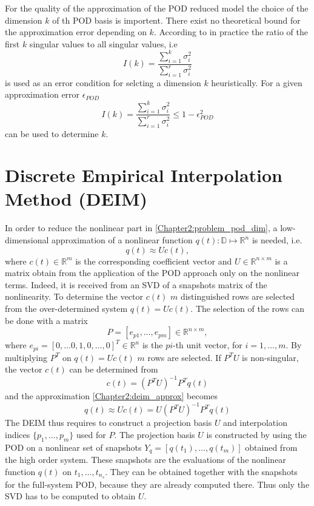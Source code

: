 For the quality of the approximation of the POD reduced model
the choice of the dimension $k$ of th POD basis is importent. There exist no theoretical bound
for the approximation error depending on $k$.
According to \cite{ROM_book2} in practice the ratio of the first $k$ singular values to all singular values, i.e
\begin{equation}
 I(k) =\frac{ \sum_{i=1}^k \sigma^2_i}{\sum_{i=1}^r \sigma^2_i}
\end{equation}
is used as an error condition for selcting a dimension $k$  heuristically.
For a given approximation error $\epsilon_{POD}$ 
\begin{equation}\label{Chapter2:eq:error_funcion_pod}
  I(k) = \frac{ \sum_{i=1}^k \sigma^2_i}{\sum_{i=1}^r \sigma^2_i} \leq 1- \epsilon_{POD}^2
\end{equation}
can be used to determine $k$. 

\section{Discrete Empirical Interpolation Method (DEIM)}
\label{Chapter2:deim}
In order to reduce the nonlinear part in \eqref{Chapter2:problem_pod_dim}, a low-dimensional approximation
of a nonlinear function $q(t): \mathbb{D} \longmapsto \mathbb{R}^n$ is needed, i.e.
\begin{equation}\label{Chapter2:deim_approx}
 q(t) \approx Uc(t),
\end{equation}
where $c(t) \in \mathbb{R}^m$ is the corresponding coefficient vector and $U \in \mathbb{R}^{n \times m}$ is
a matrix obtain from the application of the POD approach only on the nonlinear terms. Indeed, it is received from an SVD of a snapshots
matrix of the nonlinearity.
To determine the vector $c(t)$ $m$ distinguished rows are selected from the over-determined system 
$q(t) = Uc(t)$. The selection of the rows can be done with a matrix 
\begin{equation}
 P = [e_{p1},\dots,e_{pm}] \in \mathbb{R}^{n \times m},
\end{equation}
where $e_{pi} = [0,\dots0,1,0,\dots,0]^T \in \mathbb{R}^n$ is the $pi$-th unit vector, for $i= 1,\dots,m$.
By multiplying $P^T$ on $q(t) = Uc(t)$ $m$ rows are selected. If $P^TU$ is non-singular,
the vector $c(t)$ can be determined from
\begin{equation}
 c(t) = (P^TU)^{-1}P^Tq(t)
\end{equation}
and the approximation \eqref{Chapter2:deim_approx} becomes
\begin{equation}
  q(t) \approx Uc(t) = U(P^TU)^{-1}P^Tq(t)
\end{equation}
The DEIM thus requires to construct a projection basis $U$ and interpolation indices $\{ p_1,\dots,p_m\}$ used for $P$.
The projection basis $U$ is constructed by using the POD on a nonlinear set of snapshots 
$Y_{q} = [q(t_1),\dots,q(t_m)]$ obtained from the 
high order system. These snapshots are the evaluations of the nonlinear function $q(t)$ on $t_1,\dots,t_{n_s}$.
They can be obtained together with the snapshots for the full-system POD, because they are already computed there.
Thus only the SVD has to be computed to obtain $U$.

